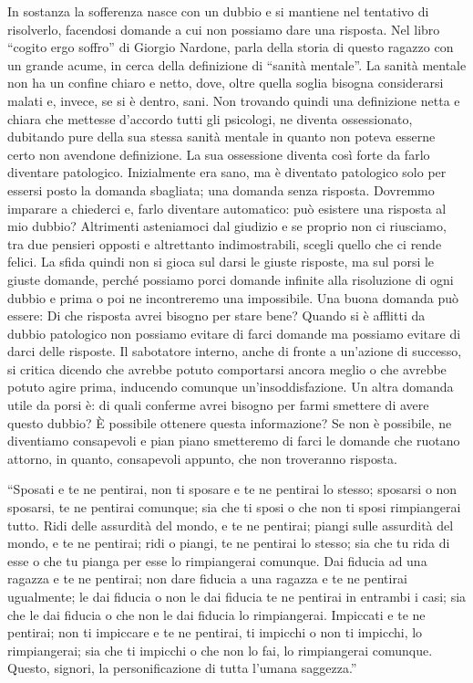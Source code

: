 \documentclass[12pt]{book} %
\begin{document}
In sostanza la sofferenza nasce con un dubbio e si mantiene nel tentativo di risolverlo, facendosi domande a cui non
possiamo dare una risposta. Nel libro “cogito ergo soffro” di Giorgio
Nardone, parla della storia di questo ragazzo con un grande acume, in cerca della definizione di “sanità mentale”. La
sanità mentale non ha un confine chiaro e netto, dove, oltre quella soglia bisogna considerarsi malati e, invece, se si
è dentro, sani. Non trovando quindi una definizione netta e chiara che mettesse d'accordo tutti
gli psicologi, ne diventa ossessionato, dubitando pure della sua stessa sanità mentale in quanto non poteva esserne
certo non avendone definizione. La sua ossessione diventa così forte da farlo diventare patologico. Inizialmente era
sano, ma è diventato patologico solo per essersi posto la domanda sbagliata; una domanda senza risposta. Dovremmo
imparare a chiederci e, farlo diventare automatico: può esistere una risposta al mio dubbio? Altrimenti asteniamoci dal
giudizio e se proprio non ci riusciamo, tra due pensieri opposti e altrettanto indimostrabili, scegli quello che ci
rende felici. La sfida quindi non si gioca sul darsi le giuste risposte, ma sul porsi le giuste domande, perché
possiamo porci domande infinite alla risoluzione di ogni dubbio e prima o poi ne incontreremo una impossibile. Una
buona domanda può essere: Di che risposta avrei bisogno per stare bene? Quando si è afflitti da dubbio patologico non
possiamo evitare di farci domande ma possiamo evitare di darci delle
risposte. Il sabotatore interno, anche di fronte a un'azione di successo, si critica dicendo che
avrebbe potuto comportarsi ancora meglio o che avrebbe potuto agire prima, inducendo comunque
un'insoddisfazione. Un altra domanda utile da porsi è: di quali conferme avrei bisogno per farmi
smettere di avere questo dubbio? È possibile ottenere questa informazione? Se non è possibile, ne diventiamo
consapevoli e pian piano smetteremo di farci le domande che ruotano attorno, in quanto, consapevoli appunto, che non
troveranno risposta. 

“Sposati e te ne pentirai, non ti sposare e te ne pentirai lo stesso; sposarsi o non sposarsi, te ne pentirai comunque;
sia che ti sposi o che non ti sposi rimpiangerai tutto. Ridi delle assurdità del mondo, e te ne pentirai; piangi sulle
assurdità del mondo, e te ne pentirai; ridi o piangi, te ne pentirai lo stesso; sia che tu rida di esse o che tu pianga
per esse lo rimpiangerai comunque. Dai fiducia ad una ragazza e te ne pentirai; non dare fiducia a una ragazza e te ne
pentirai ugualmente; le dai fiducia o non le dai fiducia te ne pentirai in entrambi i casi; sia che le dai fiducia o
che non le dai fiducia lo rimpiangerai. Impiccati e te ne pentirai; non ti impiccare e te ne pentirai, ti impicchi o
non ti impicchi, lo rimpiangerai; sia che ti impicchi o che non lo fai, lo rimpiangerai comunque. Questo, signori, la
personificazione di tutta l'umana saggezza.”
\end{document}
